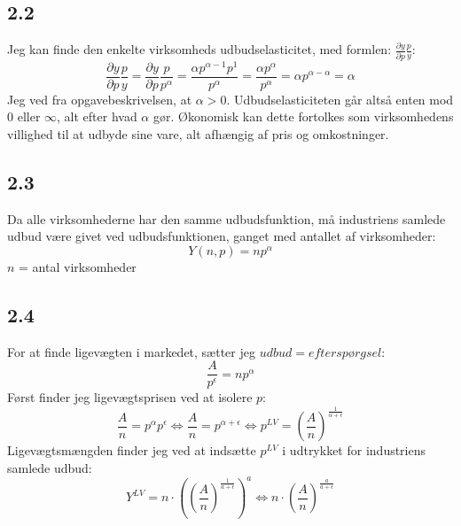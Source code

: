 \documentclass{article}
\begin{document}
\subsection*{2.2}
Jeg kan finde den enkelte virksomheds udbudselasticitet, med formlen: $\frac{\partial y}{\partial p} \frac{p}{y}$:
\begin{equation}
    \frac{\partial y}{\partial p} \frac{p}{y}=\frac{\partial y}{\partial p} \frac{p}{p^\alpha} = \frac{\alpha p^{\alpha-1} p^1}{p^\alpha} = \frac{\alpha p^\alpha}{p^\alpha} = \alpha p^{\alpha-\alpha} = \alpha
\end{equation}
Jeg ved fra opgavebeskrivelsen, at $\alpha>0$. Udbudselasticiteten går altså enten mod $0$ eller $\infty$, alt efter hvad $\alpha$ gør. Økonomisk kan dette fortolkes som virksomhedens villighed til at udbyde sine vare, alt afhængig af pris og omkostninger.

\subsection*{2.3}
Da alle virksomhederne har den samme udbudsfunktion, må industriens samlede udbud være givet ved udbudsfunktionen, ganget med antallet af virksomheder:
\begin{equation}
    Y(n, p)=n p^\alpha
\end{equation}
$n$ = antal virksomheder

\subsection*{2.4}
For at finde ligevægten i markedet, sætter jeg $udbud = efterspørgsel$:
\begin{equation}
    \frac{A}{p^\epsilon}=n p^\alpha
\end{equation}
Først finder jeg ligevægtsprisen ved at isolere $p$:
\begin{equation}
    \frac{A}{n}=p^\alpha p^\epsilon \Leftrightarrow \frac{A}{n}=p^{\alpha+\epsilon} \Leftrightarrow p^{LV}=\left(\frac{A}{n}\right)^{\frac{1}{\alpha+\epsilon}}
\end{equation}
Ligevægtsmængden finder jeg ved at indsætte $p^{LV}$ i udtrykket for industriens samlede udbud:
\begin{equation}
    Y^{LV}=n \cdot\left(\left(\frac{A}{n}\right)^{\frac{1}{a+\epsilon}}\right)^a \Leftrightarrow n \cdot\left(\frac{A}{n}\right)^{\frac{a}{a+\epsilon}}
\end{equation}
\end{document}
